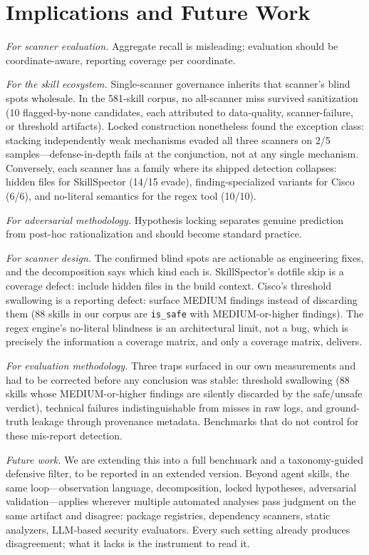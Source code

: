 \documentclass[sigconf,nonacm]{acmart}
\begin{document}
\section{Implications and Future Work}
\label{sec:implications}

\emph{For scanner evaluation.} Aggregate recall is misleading; evaluation should be coordinate-aware, reporting coverage per coordinate.

\emph{For the skill ecosystem.} Single-scanner governance inherits that scanner's blind spots wholesale. In the 581-skill corpus, no all-scanner miss survived sanitization (10 flagged-by-none candidates, each attributed to data-quality, scanner-failure, or threshold artifacts). Locked construction nonetheless found the exception class: stacking independently weak mechanisms evaded all three scanners on 2/5 samples---defense-in-depth fails at the conjunction, not at any single mechanism. Conversely, each scanner has a family where its shipped detection collapses: hidden files for SkillSpector (14/15 evade), finding-specialized variants for Cisco (6/6), and no-literal semantics for the regex tool (10/10).

\emph{For adversarial methodology.} Hypothesis locking separates genuine prediction from post-hoc rationalization and should become standard practice.

\emph{For scanner design.} The confirmed blind spots are actionable as engineering fixes, and the decomposition says which kind each is. SkillSpector's dotfile skip is a coverage defect: include hidden files in the build context. Cisco's threshold swallowing is a reporting defect: surface MEDIUM findings instead of discarding them (88 skills in our corpus are \texttt{is\_safe} with MEDIUM-or-higher findings). The regex engine's no-literal blindness is an architectural limit, not a bug, which is precisely the information a coverage matrix, and only a coverage matrix, delivers.

\emph{For evaluation methodology.} Three traps surfaced in our own measurements and had to be corrected before any conclusion was stable: threshold swallowing (88 skills whose MEDIUM-or-higher findings are silently discarded by the safe/unsafe verdict), technical failures indistinguishable from misses in raw logs, and ground-truth leakage through provenance metadata. Benchmarks that do not control for these mis-report detection.

\emph{Future work.} We are extending this into a full benchmark and a taxonomy-guided defensive filter, to be reported in an extended version. Beyond agent skills, the same loop---observation language, decomposition, locked hypotheses, adversarial validation---applies wherever multiple automated analyses pass judgment on the same artifact and disagree: package registries, dependency scanners, static analyzers, LLM-based security evaluators. Every such setting already produces disagreement; what it lacks is the instrument to read it.
\end{document}
